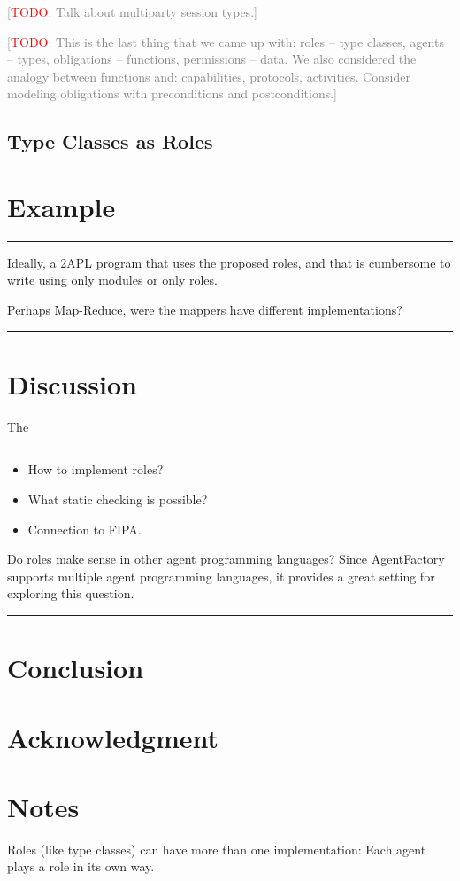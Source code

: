 \documentclass[conference,compsoc]{IEEEtran} %
\newcommand{\todo}[1]{{\small \textcolor{gray}{[\textcolor{red}{TODO}: #1]}}}
\newenvironment{notes}{\medskip\hrule\nobreak\smallskip\narrower}{\smallskip\hrule\medskip}
\begin{document}
\todo{Talk about multiparty session types.}


\todo{This is the last thing that we came up with: roles -- type classes,
agents -- types, obligations -- functions, permissions -- data. We also
considered the analogy between functions and: capabilities, protocols,
activities. Consider modeling obligations with preconditions and
postconditions.}



\subsection{Type Classes as Roles} %


\section{Example} %

\begin{notes}
Ideally, a 2APL program that uses the proposed roles, and that is 
cumbersome to write using only modules or only roles.

Perhaps Map-Reduce, were the mappers have different implementations?
\end{notes}

\section{Discussion} %

The 


\begin{notes}
\begin{itemize}
\item How to implement roles?
\item What static checking is possible?
\item Connection to FIPA.
\end{itemize}

Do roles make sense in other agent programming languages? Since AgentFactory
supports multiple agent programming languages, it provides a great setting
for exploring this question.
\end{notes}

\section{Conclusion} %

\section*{Acknowledgment}




\section*{Notes}

Roles (like type classes) can have more than one implementation: Each agent
plays a role in its own way.

\end{document}
